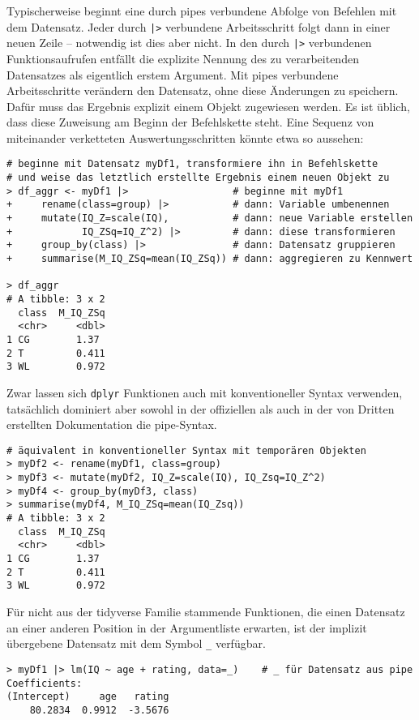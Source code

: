 Typischerweise beginnt eine durch pipes verbundene Abfolge von Befehlen mit dem Datensatz. Jeder durch \lstinline!|>! verbundene Arbeitsschritt folgt dann in einer neuen Zeile -- notwendig ist dies aber nicht. In den durch \lstinline!|>! verbundenen Funktionsaufrufen entfällt die explizite Nennung des zu verarbeitenden Datensatzes als eigentlich erstem Argument. Mit pipes verbundene Arbeitsschritte verändern den Datensatz, ohne diese Änderungen zu speichern. Dafür muss das Ergebnis explizit einem Objekt zugewiesen werden. Es ist üblich, dass diese Zuweisung am Beginn der Befehlskette steht. Eine Sequenz von miteinander verketteten Auswertungsschritten könnte etwa so aussehen:
\begin{lstlisting}
# beginne mit Datensatz myDf1, transformiere ihn in Befehlskette
# und weise das letztlich erstellte Ergebnis einem neuen Objekt zu
> df_aggr <- myDf1 |>                  # beginne mit myDf1
+     rename(class=group) |>           # dann: Variable umbenennen
+     mutate(IQ_Z=scale(IQ),           # dann: neue Variable erstellen
+            IQ_ZSq=IQ_Z^2) |>         # dann: diese transformieren
+     group_by(class) |>               # dann: Datensatz gruppieren
+     summarise(M_IQ_ZSq=mean(IQ_ZSq)) # dann: aggregieren zu Kennwert

> df_aggr
# A tibble: 3 x 2
  class  M_IQ_ZSq
  <chr>     <dbl>
1 CG        1.37 
2 T         0.411
3 WL        0.972
\end{lstlisting}

Zwar lassen sich \lstinline!dplyr! Funktionen auch mit konventioneller Syntax verwenden, tatsächlich dominiert aber sowohl in der offiziellen als auch in der von Dritten erstellten Dokumentation die pipe-Syntax.
\begin{lstlisting}
# äquivalent in konventioneller Syntax mit temporären Objekten
> myDf2 <- rename(myDf1, class=group)
> myDf3 <- mutate(myDf2, IQ_Z=scale(IQ), IQ_Zsq=IQ_Z^2)
> myDf4 <- group_by(myDf3, class)
> summarise(myDf4, M_IQ_ZSq=mean(IQ_Zsq))
# A tibble: 3 x 2
  class  M_IQ_ZSq
  <chr>     <dbl>
1 CG        1.37 
2 T         0.411
3 WL        0.972
\end{lstlisting}

Für nicht aus der tidyverse Familie stammende Funktionen, die einen Datensatz an einer anderen Position in der Argumentliste erwarten, ist der implizit übergebene Datensatz mit dem Symbol \lstinline!_! verfügbar.
\begin{lstlisting}
> myDf1 |> lm(IQ ~ age + rating, data=_)    # _ für Datensatz aus pipe
Coefficients:
(Intercept)     age   rating
    80.2834  0.9912  -3.5676
\end{lstlisting}

